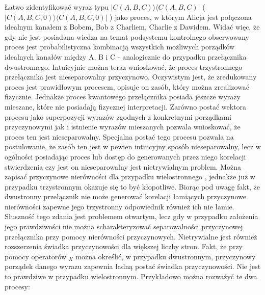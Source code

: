 \documentclass[10pt]{article} %
\newcommand{\Ket}[1]{|#1\rangle}
\newcommand{\Bra}[1]{\langle#1|}
\begin{document}
Łatwo zidentyfikować wyraz typu $\Ket{C(A,B,C)}\Bra{C(A,B,C)}$ ( $\Ket{C(A,B,C,0)}\Bra{C(A,B,C,0)}$ ) jako proces, w którym Alicja jest połączona idealnym kanałem z Bobem, Bob z Charliem, Charlie z Dawidem. Widać więc, że gdy nie jest posiadana wiedza na temat podsystemu kontrolnego obserwowany proces jest probabilistyczna kombinacją wszystkich możliwych porządków idealnych kanałów między A, B i C - analogicznie do przypadku przełącznika dwustronnego. Intuicyjnie można teraz wnioskować, że proces trzystronnego przełącznika jest nieseparowalny przyczynowo. Oczywistym jest, że zredukowany proces jest prawidłowym procesem, opisuje on zasób, który można zrealizować fizycznie. Jednakże proces kwantowego przełącznika posiada jeszcze wyrazy mieszane, które nie posiadają fizycznej interpretacji. Zarówno postać wektora procesu jako superpozycji wyrazów zgodnych z konkretnymi porządkami przyczynowymi jak i istnienie wyrazów mieszanych pozwala wnioskować, że proces ten jest nieseparowalny. Specjalna postać tego procesu pozwala na postulowanie, że zasób ten jest w pewien intuicyjny sposób nieseparowalny, lecz w ogólności posiadając proces lub dostęp do generowanych przez niego korelacji stwierdzenia czy jest on nieseparowalny jest nietrywialnym problem. Można zapisać przyczynowe nierówności dla przypadku wielostronnego \cite{mp_ci}, jednakże już w przypadku trzystronnym okazuje się to być kłopotliwe.
Biorąc pod uwagę fakt, że dwustronny przełącznik nie może generować korelacji łamiących przyczynowe nierówności zapewne jego trzystronny odpowiednik również ich nie łamie. Słuszność tego zdania jest problemem otwartym, lecz gdy w przypadku założenia jego prawdziwości nie można scharakteryzować separowalności przyczynowej przełącznika przy pomocy nierówności przyczynowych. Nietrywialne jest również rozszerzenia świadka przyczynowości dla większej liczby stron. Fakt, że przy pomocy operatorów ${}_X$ można określić, w przypadku dwustronnym, przyczynowy porządek danego wyrazu zapewnia ładną postać świadka przyczynowości. Nie jest to prawdziwe w przypadku wielostronnym. Przykładowo można rozważyć te dwa procesy:
\end{document}
